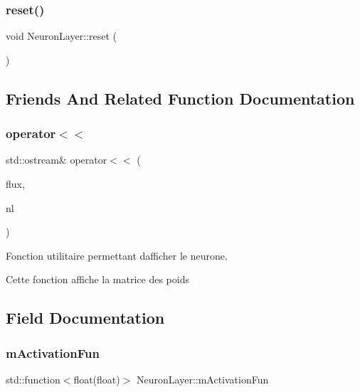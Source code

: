 \subsubsection{\texorpdfstring{reset()}{reset()}}
{\footnotesize\ttfamily void Neuron\+Layer\+::reset (\begin{DoxyParamCaption}{ }\end{DoxyParamCaption})}



\subsection{Friends And Related Function Documentation}
\mbox{\label{classNeuronLayer_adbe40702c22550c0392b3447e5d63c9a}} 
\subsubsection{\texorpdfstring{operator$<$$<$}{operator<<}}
{\footnotesize\ttfamily std\+::ostream\& operator$<$$<$ (\begin{DoxyParamCaption}\item[{std\+::ostream \&}]{flux,  }\item[{\hyperlink{classNeuronLayer}{Neuron\+Layer}}]{nl }\end{DoxyParamCaption})\hspace{0.3cm}{\ttfamily [friend]}}



Fonction utilitaire permettant d\textquotesingle{}afficher le neurone. 

Cette fonction affiche la matrice des poids 

\subsection{Field Documentation}
\mbox{\label{classNeuronLayer_ac0ff52b79f1a068e75f0eb0309b5e683}} 
\subsubsection{\texorpdfstring{m\+Activation\+Fun}{mActivationFun}}
{\footnotesize\ttfamily std\+::function$<$float(float)$>$ Neuron\+Layer\+::m\+Activation\+Fun\hspace{0.3cm}{\ttfamily [private]}}



